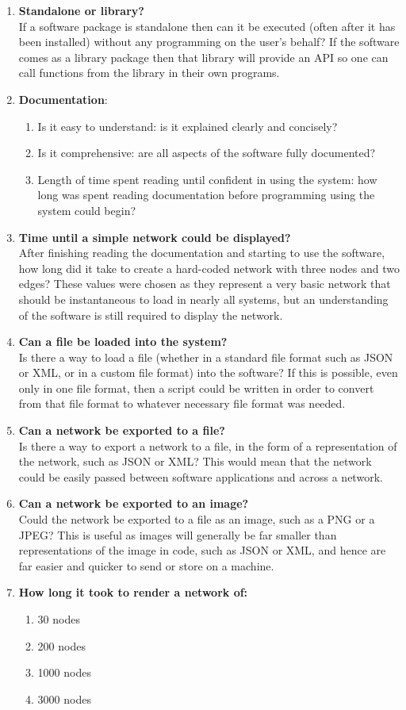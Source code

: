\documentclass[../dissertation.tex]{subfiles}
\begin{document}
\begin{enumerate}
	\item \textbf{Standalone or library?}\\
	If a software package is standalone then can it be executed (often after it has been installed) without any programming on the user's behalf? If the software comes as a library package then that library will provide an API so one can call functions from the library in their own programs. 
	\item \textbf{Documentation}:
	\begin{enumerate}
		\item Is it easy to understand: is it explained clearly and concisely?
		\item Is it comprehensive: are all aspects of the software fully documented?
		\item Length of time spent reading until confident in using the system: how long was spent reading documentation before programming using the system could begin?
	\end{enumerate}
	\item \textbf{Time until a simple network could be displayed?}\\
	After finishing reading the documentation and starting to use the software, how long did it take to create a hard-coded network with three nodes and two edges? These values were chosen as they represent a very basic network that should be instantaneous to load in nearly all systems, but an understanding of the software is still required to display the network.
	\item \textbf{Can a file be loaded into the system?}\\
	Is there a way to load a file (whether in a standard file format such as JSON or XML, or in a custom file format) into the software? If this is possible, even only in one file format, then a script could be written in order to convert from that file format to whatever necessary file format was needed. 
	\item \textbf{Can a network be exported to a file?}\\
	Is there a way to export a network to a file, in the form of a representation of the network, such as JSON or XML? This would mean that the network could be easily passed between software applications and across a network.
	\item \textbf{Can a network be exported to an image?}\\
	Could the network be exported to a file as an image, such as a PNG or a JPEG? This is useful as images will generally be far smaller than representations of the image in code, such as JSON or XML, and hence are far easier and quicker to send or store on a machine.
	\item \textbf{How long it took to render a network of:}
	\begin{enumerate}
	    \item 30 nodes
	    \item 200 nodes
	    \item 1000 nodes
	    \item 3000 nodes
	\end{enumerate}
	

\end{enumerate}
\end{document}

